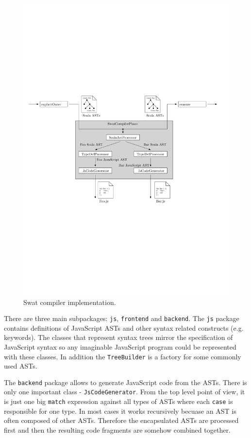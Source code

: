 \documentclass[12pt,a4paper]{report}
\begin{document}
\begin{figure}[ht]
  \centering
	\includegraphics[width=\linewidth,height=\textheight,keepaspectratio]{img/SwatCompiler.pdf}
	\caption{Swat compiler implementation.}
	\label{SwatCompiler}
\end{figure}

There are three main subpackages: \texttt{js}, \texttt{frontend} and \texttt{backend}. The \texttt{js} package contains definitions of JavaScript ASTs and other syntax related constructs (e.g. keywords). The classes that represent syntax trees mirror the specification of JavaScript syntax \cite{EcmaScript} so any imaginable JavaScript program could be represented with these classes. In addition the \texttt{TreeBuilder} is a factory for some commonly used ASTs.

The \texttt{backend} package allows to generate JavaScript code from the ASTs. There is only one important class - \texttt{JsCodeGenerator}. From the top level point of view, it is just one big \texttt{match} expression against all types of ASTs where each \texttt{case} is responsible for one type. In most cases it works recursively becuase an AST is often composed of other ASTs. Therefore the encapsulated ASTs are processed first and then the resulting code fragments are somehow combined together.
\end{document}
